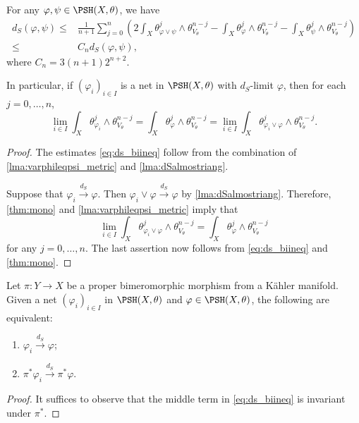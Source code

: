 \begin{corollary}\label{cor:dsmetricdoubleineq}
    For any $\varphi,\psi\in \PSH(X,\theta)$, we have
    \begin{equation}\label{eq:ds_biineq}
        \begin{split}
            d_S(\varphi,\psi)\leq & \frac{1}{n+1}\sum_{j=0}^n \left( 2\int_X \theta_{\varphi\lor \psi}^j\wedge \theta_{V_{\theta}}^{n-j}-\int_X \theta_{\varphi}^j\wedge \theta_{V_{\theta}}^{n-j}-\int_X \theta_{\psi}^j\wedge \theta_{V_{\theta}}^{n-j} \right) \\
            \leq & C_n d_S(\varphi,\psi),
        \end{split}
\end{equation}
where $C_n=3(n+1)2^{n+2}$.

In particular, if $(\varphi_i)_{i\in I}$ is a net in $\PSH(X,\theta)$ with $d_S$-limit $\varphi$, then for each $j=0,\ldots,n$,
\[
    \lim_{i\in I}\int_X \theta_{\varphi_i}^j\wedge \theta_{V_{\theta}}^{n-j}=\int_X \theta_{\varphi}^j\wedge \theta_{V_{\theta}}^{n-j}=\lim_{i\in I}\int_X \theta_{\varphi_i\lor \varphi}^j\wedge \theta_{V_{\theta}}^{n-j}.
\]
\end{corollary}
\begin{proof}
    The estimates \eqref{eq:ds_biineq} follow from the combination of \cref{lma:varphileqpsi_metric} and \cref{lma:dSalmostriang}.

    Suppose that $\varphi_i\xrightarrow{d_S}\varphi$. Then $\varphi_i\lor \varphi\xrightarrow{d_S}\varphi$ by \cref{lma:dSalmostriang}. Therefore, \cref{thm:mono} and \cref{lma:varphileqpsi_metric} imply that
    \[
    \lim_{i\in I}\int_X \theta_{\varphi_i\lor \varphi}^j\wedge \theta_{V_{\theta}}^{n-j}= \int_X \theta_{\varphi}^j\wedge \theta_{V_{\theta}}^{n-j}
    \]
    for any $j=0,\ldots,n$.
    The last assertion now follows from \eqref{eq:ds_biineq} and \cref{thm:mono}.
\end{proof}

\begin{corollary}\label{cor:dSconv_bimero}
    Let $\pi\colon Y\rightarrow X$ be a proper bimeromorphic morphism from a Kähler manifold. Given a net $(\varphi_i)_{i\in I}$ in $\PSH(X,\theta)$ and $\varphi\in \PSH(X,\theta)$, the following are equivalent:
    \begin{enumerate}
        \item $\varphi_i\xrightarrow{d_S}\varphi$;
        \item $\pi^*\varphi_i\xrightarrow{d_S}\pi^*\varphi$.
    \end{enumerate}
\end{corollary}
\begin{proof}
    It suffices to observe that the middle term in \eqref{eq:ds_biineq} is invariant under $\pi^*$.
\end{proof}


